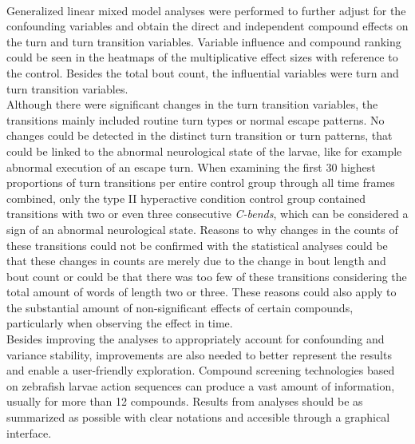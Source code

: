\documentclass[a4paper,12pt]{article}
\begin{document}
\\Generalized linear mixed model analyses were performed to further adjust for the confounding variables and obtain the direct and independent compound effects on the turn and turn transition variables. Variable influence and compound ranking could be seen in the heatmaps of the multiplicative effect sizes with reference to the control. Besides the total bout count, the influential variables were turn and turn transition variables.\\Although there were significant changes in the turn transition variables, the transitions mainly included routine turn types or normal escape patterns. No changes could be detected in the distinct turn transition or turn patterns, that could be linked to the abnormal neurological state of the larvae, like for example abnormal execution of an escape turn. When examining the first 30 highest proportions of turn transitions per entire control group through all time frames combined, only the type II hyperactive condition control group contained transitions with two or even three consecutive \textit{C-bends}, which can be considered a sign of an abnormal neurological state. Reasons to why changes in the counts of these transitions could not be confirmed with the statistical analyses could be that these changes in counts are merely due to the change in bout length and bout count or could be that there was too few of these transitions considering the total amount of words of length two or three. These reasons could also apply to the substantial amount of non-significant effects of certain compounds, particularly when observing the effect in time.\\Besides improving the analyses to appropriately account for confounding and variance stability, improvements are also needed to better represent the results and enable a user-friendly exploration. Compound screening technologies based on zebrafish larvae action sequences can produce a vast amount of information, usually for more than 12 compounds. Results from analyses should be as summarized as possible with clear notations and accesible through a graphical interface.
\end{document}
